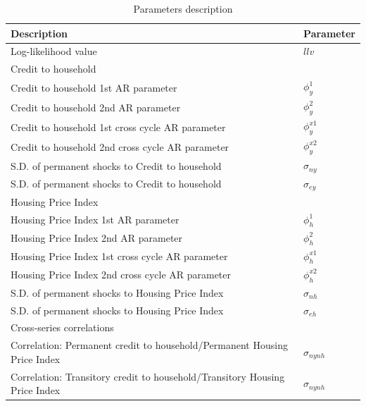 \documentclass[12pt]{article}
\begin{document}
\begin{outline}[enumerate]
		\begin{table}[]
			\begin{threeparttable}
				\caption {\label{tab:table1} Parameters description}
				\begin{tabular}{@{}ll@{}}
					\toprule
					Description & Parameter\\
					\midrule
					Log-likelihood value & $llv$ \\[2pt] 
					Credit to household & \\
					\quad Credit to household 1st AR parameter  & $\phi^1_{y}$ \\[2pt] 
					\quad Credit to household 2nd AR parameter  & $\phi^2_{y}$ \\[2pt] 
					\quad Credit to household 1st cross cycle AR parameter  & $\phi^{x1}_{y}$ \\[2pt] 
					\quad Credit to household 2nd cross cycle AR parameter  & $\phi^{x2}_{y}$ \\[2pt] 
					\quad S.D. of permanent shocks to Credit to household & $\sigma_{ny}$ \\[2pt] 
					\quad S.D. of permanent shocks to Credit to household & $\sigma_{ey}$ \\[2pt]
					Housing Price Index & \\
					\quad Housing Price Index 1st AR parameter  & $\phi^1_{h}$ \\[2pt] 
					\quad Housing Price Index 2nd AR parameter  & $\phi^2_{h}$ \\[2pt] 
					\quad Housing Price Index 1st cross cycle AR parameter  & $\phi^{x1}_{h}$ \\[2pt] 
					\quad Housing Price Index 2nd cross cycle AR parameter  & $\phi^{x2}_{h}$ \\[2pt] 
					\quad S.D. of permanent shocks to Housing Price Index & $\sigma_{nh}$ \\[2pt] 
					\quad S.D. of permanent shocks to Housing Price Index & $\sigma_{eh}$ \\[2pt]
					Cross-series correlations & \\
					\quad Correlation: Permanent credit to household/Permanent Housing Price Index  & $\sigma_{nynh}$ \\[2pt] 
					\quad Correlation: Transitory credit to household/Transitory Housing Price Index  & $\sigma_{nynh}$ \\[2pt] 
										
					\bottomrule
				\end{tabular}
			\end{threeparttable}
		\end{table}
		

\end{outline}
\end{document}
